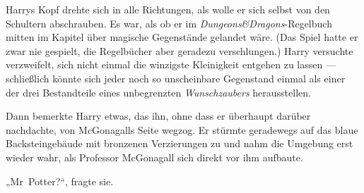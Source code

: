 Harrys Kopf drehte sich in alle Richtungen, als wolle er sich selbst von den Schultern abschrauben. Es war, als ob er im \emph{Dungeons\&Dragons}-Regelbuch mitten im Kapitel über magische Gegenstände gelandet wäre. (Das Spiel hatte er zwar nie gespielt, die Regelbücher aber geradezu verschlungen.) Harry versuchte verzweifelt, sich nicht einmal die winzigste Kleinigkeit entgehen zu lassen — schließlich könnte sich jeder noch so unscheinbare Gegenstand einmal als einer der drei Bestandteile eines unbegrenzten \emph{Wunschzaubers} herausstellen.

Dann bemerkte Harry etwas, das ihn, ohne dass er überhaupt darüber nachdachte, von McGonagalls Seite wegzog. Er stürmte geradewegs auf das blaue Backsteingebäude mit bronzenen Verzierungen zu und nahm die Umgebung erst wieder wahr, als Professor McGonagall sich direkt vor ihm aufbaute.

„Mr~Potter?“, fragte sie.

